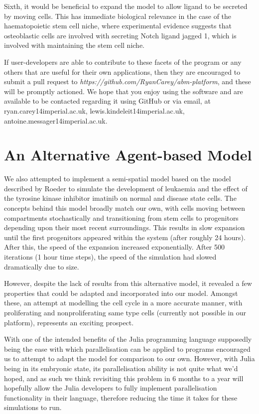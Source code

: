 \documentclass[12pt]{article}
\begin{document}
Sixth, it would be beneficial to expand the model to allow ligand to be 
secreted by moving cells. This has immediate biological relevance in the 
case of the haematopoietic stem cell niche, where experimental evidence 
suggests that osteoblastic cells are involved with secreting Notch 
ligand jagged 1, which is involved with maintaining the stem cell niche.
\cite{}

If user-developers are able to contribute to these facets of the program 
or any others that are useful for their own applications, then they are 
encouraged to submit a pull request to {\itshape 
https://github.com/RyanCarey/abm-platform}, and these will be
promptly actioned. We hope that you enjoy using the software 
and are available to be contacted regarding it using GitHub or via 
email, at ryan.carey14i\makeatletter mperial.ac.uk, 
lewis.kindeleit14\makeatletter imperial.ac.uk, 
antoine.messager14\makeatletter imperial.ac.uk.

\newpage

\section{An Alternative Agent-based Model}

We also attempted to implement a semi-spatial model based on the model 
described by Roeder to simulate the development of leukaemia and the 
effect of the tyrosine kinase inhibitor imatinib on normal and disease 
state cells. The concepts behind this model broadly match our own, with 
cells moving between compartments stochastically and transitioning from 
stem cells to progenitors depending upon their most recent surroundings. 
This results in slow expansion until the first progenitors appeared 
within the system (after roughly 24 hours). After this, the speed of the 
expansion increased exponentially. After 500 iterations (1 hour time 
steps), the speed of the simulation had slowed dramatically due to size.

However, despite the lack of results from this alternative model, it 
revealed a few properties that could be adapted and incorporated into 
our model. Amongst these, an attempt at modelling the cell cycle in a 
more accurate manner, with proliferating and nonproliferating same type 
cells (currently not possible in our platform), represents an exciting 
prospect.

With one of the intended benefits of the Julia programming language 
supposedly being the ease with which parallelisation can be applied to 
programs encouraged us to attempt to adapt the model for comparison to 
our own. However, with Julia being in its embryonic state, its 
parallelisation ability is not quite what we'd hoped, and as such we 
think revisiting this problem in 6 months to a year will hopefully allow 
the Julia developers to fully implement parallelisation functionality in 
their language, therefore reducing the time it takes for these 
simulations to run.
\end{document}
